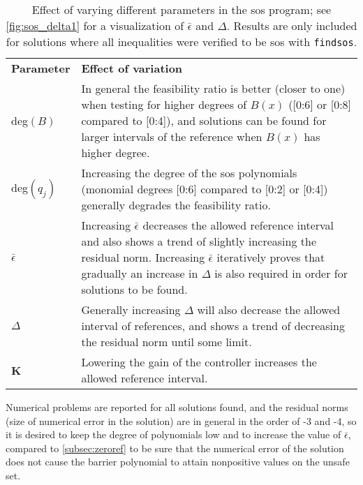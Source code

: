 \begin{table}[htbp]
\begin{tabularx}{\textwidth}{l X}
\rowcolor{HeaderBlue}
\textbf{Parameter} & \textbf{Effect of variation}\\
deg$(B)$ & In general the feasibility ratio is better (closer to one) when testing for higher degrees of $B(x)$ ([0:6] or [0:8] compared to [0:4]), and solutions can be found for larger intervals of the reference when $B(x)$ has higher degree.\\
\rowcolor{textBlue}
deg$(q_j)$ & Increasing the degree of the \gls{sos} polynomials (monomial degrees [0:6] compared to [0:2] or [0:4]) generally degrades the feasibility ratio.\\
$\bar{\epsilon}$ & Increasing $\bar{\epsilon}$ decreases the allowed reference interval and also shows a trend of slightly increasing the residual norm. Increasing $\bar{\epsilon}$ iteratively proves that gradually an increase in $\Delta$ is also required in order for solutions to be found. \\
\rowcolor{textBlue}
$\Delta$ & Generally increasing $\Delta$ will also decrease the allowed interval of references, and shows a trend of decreasing the residual norm until some limit.\\
\textbf{K} & Lowering the gain of the controller increases  the allowed reference interval.
\end{tabularx}
\caption{Effect of varying different parameters in the \gls{sos} program; see \autoref{fig:sos_delta1} for a visualization of $\bar{\epsilon}$ and $\Delta$. Results are only included for solutions where all inequalities were verified to be \gls{sos} with \texttt{findsos}.}
\label{tab:sostools_varying_param}
\end{table}

Numerical problems are reported for all solutions found, and the residual norms (size of numerical error in the solution) are in general in the order of -3 and -4, so it is desired to keep the degree of polynomials low and to increase the value of $\bar{\epsilon}$, compared to \autoref{subsec:zeroref} to be sure that the numerical error of the solution does not cause the barrier polynomial to attain nonpositive values on the unsafe set. 


